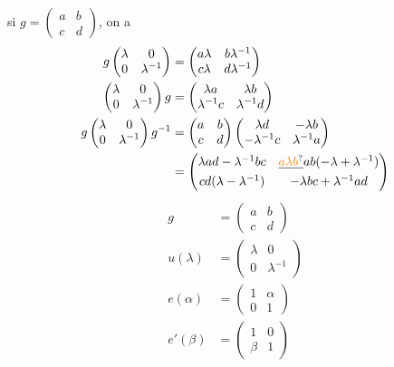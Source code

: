 si $g=\begin{pmatrix}a&b\\c&d\end{pmatrix}$, on a
\[\begin{aligned}
g\begin{pmatrix}\lambda&0\\0&\lambda^{-1}\end{pmatrix}&=\begin{pmatrix}a\lambda&b\lambda^{-1}\\c\lambda&d\lambda^{-1}\end{pmatrix}\\
\begin{pmatrix}\lambda&0\\0&\lambda^{-1}\end{pmatrix}g&=\begin{pmatrix}\lambda a&\lambda b\\\lambda^{-1}c&\lambda^{-1}d\end{pmatrix}\\
g\begin{pmatrix}\lambda&0\\0&\lambda^{-1}\end{pmatrix}g^{-1}&=\begin{pmatrix}a&b\\c&d\end{pmatrix}\begin{pmatrix}\lambda d&-\lambda b\\-\lambda^{-1}c&\lambda^{-1}a\end{pmatrix}\\
&=\begin{pmatrix}\lambda ad-\lambda^{-1}bc&\deleted{\unsure{a\lambda b}}ab(-\lambda+\lambda^{-1})\\cd(\lambda-\lambda^{-1})&-\lambda bc+\lambda^{-1}ad\end{pmatrix}
\end{aligned}\]
\[\begin{aligned}
g&=\begin{pmatrix}a&b\\c&d\end{pmatrix}\\u(\lambda)&=\begin{pmatrix}\lambda&0\\0&\lambda^{-1}\end{pmatrix}\\e(\alpha)&=\begin{pmatrix}1&\alpha\\0&1\end{pmatrix}\\e'(\beta)&=\begin{pmatrix}1&0\\\beta&1\end{pmatrix}
\end{aligned}\]
